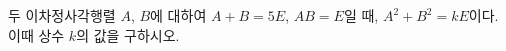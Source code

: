 \hspace*{2mm}\begin{minipage}[t]{\dimexpr\linewidth-2mm\relax}\vspace{0pt}
두 이차정사각행렬 $A$, $B$에 대하여 $A+B=5E$, $AB=E$일 때, $A^2+B^2=kE$이다. 이때 상수 $k$의 값을 구하시오. \end{minipage}
